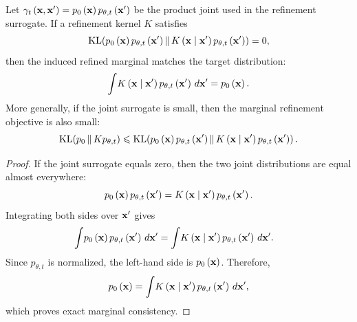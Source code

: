 \begin{proposition}
\label{prop:marginal_consistency_independent}
Let $\gamma_t\left(\mathbf{x},\mathbf{x}'\right)=p_0\left(\mathbf{x}\right)p_{\theta,t}\left(\mathbf{x}'\right)$ be the product joint used in the refinement surrogate. 
If a refinement kernel $K$ satisfies
\begin{equation*}
    \operatorname{KL}\!\left(
        p_0\left(\mathbf{x}\right)p_{\theta,t}\left(\mathbf{x}'\right)
        \,\middle\|\,
        K\left(\mathbf{x}\mid\mathbf{x}'\right)p_{\theta,t}\left(\mathbf{x}'\right)
    \right)
    =
    0,
\end{equation*}
then the induced refined marginal matches the target distribution:
\begin{equation*}
    {\int}
    K\left(\mathbf{x}\mid\mathbf{x}'\right)p_{\theta,t}\left(\mathbf{x}'\right)\,d\mathbf{x}'
    =
    p_0\left(\mathbf{x}\right).
\end{equation*}
More generally, if the joint surrogate is small, then the marginal refinement objective is also small:
\begin{equation*}
    \operatorname{KL}\!\left(
        p_0
        \,\middle\|\,
        Kp_{\theta,t}
    \right)
    \leqslant
    \operatorname{KL}\!\left(
        p_0\left(\mathbf{x}\right)p_{\theta,t}\left(\mathbf{x}'\right)
        \,\middle\|\,
        K\left(\mathbf{x}\mid\mathbf{x}'\right)p_{\theta,t}\left(\mathbf{x}'\right)
    \right).
\end{equation*}
\end{proposition}

\begin{proof}
If the joint surrogate equals zero, then the two joint distributions are equal almost everywhere:
\begin{equation*}
    p_0\left(\mathbf{x}\right)p_{\theta,t}\left(\mathbf{x}'\right)
    =
    K\left(\mathbf{x}\mid\mathbf{x}'\right)p_{\theta,t}\left(\mathbf{x}'\right).
\end{equation*}
Integrating both sides over $\mathbf{x}'$ gives
\begin{align*}
    {\int}
    p_0\left(\mathbf{x}\right)p_{\theta,t}\left(\mathbf{x}'\right)\,d\mathbf{x}'
    &=
    {\int}
    K\left(\mathbf{x}\mid\mathbf{x}'\right)p_{\theta,t}\left(\mathbf{x}'\right)\,d\mathbf{x}' .
\end{align*}
Since $p_{\theta,t}$ is normalized, the left-hand side is $p_0\left(\mathbf{x}\right)$. 
Therefore,
\begin{equation*}
    p_0\left(\mathbf{x}\right)
    =
    {\int}
    K\left(\mathbf{x}\mid\mathbf{x}'\right)p_{\theta,t}\left(\mathbf{x}'\right)\,d\mathbf{x}',
\end{equation*}
which proves exact marginal consistency.
\end{proof}


